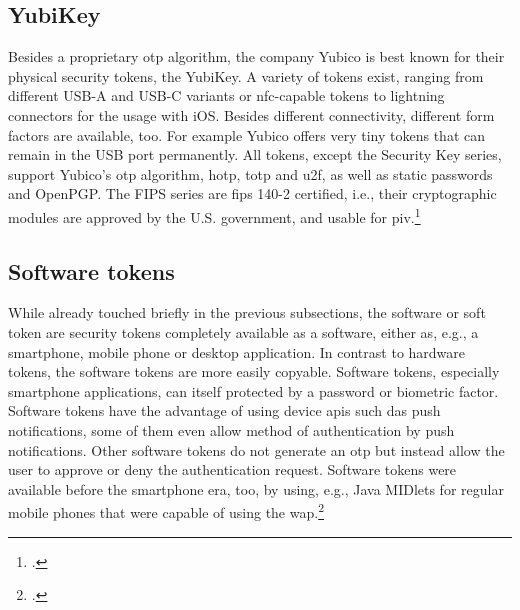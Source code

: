 \subsection{YubiKey}

Besides a proprietary \gls{otp} algorithm, the company Yubico is best known for their physical security tokens, the YubiKey. A variety of tokens exist, ranging from different USB-A and USB-C variants or \gls{nfc}-capable tokens to lightning connectors for the usage with iOS. Besides different connectivity, different form factors are available, too. For example Yubico offers very tiny tokens that can remain in the USB port permanently. All tokens, except the \frqq Security Key\flqq{} series, support Yubico's \gls{otp} algorithm, \gls{hotp}, \gls{totp} and \gls{u2f}, as well as static passwords and OpenPGP. The \frqq FIPS series\flqq{} are \gls{fips} 140-2 certified, i.e., their cryptographic modules are approved by the U.S. government, and usable for \gls{piv}.\footcites[See][716]{HUSEYNOV2017715}[See][83]{Jacobs:2016:STA:2953926.2953927}[See][109]{Jacobs:2019}

\subsection{Software tokens}

While already touched briefly in the previous subsections, the software or soft token are security tokens completely available as a software, either as, e.g., a smartphone, mobile phone or desktop application. In contrast to hardware tokens, the software tokens are more easily copyable. Software tokens, especially smartphone applications, can itself protected by a password or biometric factor. Software tokens have the advantage of using device \glspl{api} such das push notifications, some of them even allow method of \frqq authentication by push notifications\flqq. Other software tokens do not generate an \gls{otp} but instead allow the user to approve or deny the authentication request. Software tokens were available before the smartphone era, too, by using, e.g., Java MIDlets for regular mobile phones that were capable of using the \gls{wap}.\footcites[See][717]{HUSEYNOV2017715}[See][111]{ELMALIKI201475}[See][60]{Ulqinaku:2019:FPP:3317549.3323404}[See][222--223]{dasgupta2017multi}[See][3]{4300040}